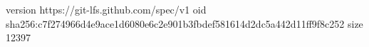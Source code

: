 version https://git-lfs.github.com/spec/v1
oid sha256:c7f274966d4e9ace1d6080e6c2e901b3fbdef581614d2dc5a442d11ff9f8c252
size 12397
